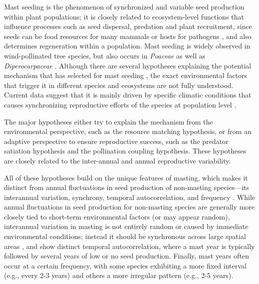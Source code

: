 \documentclass[11pt,letter]{article}
\begin{document}
Mast seeding is the phenomenon of synchronized and variable seed production within plant populations; it is closely related to ecosystem-level functions that influence processes such as seed dispersal, predation and plant recruitment, since seeds can be food resources for many mammals or hosts for pathogens  \citep{davies2024seed, janzen1971seed, kelly1994evolutionary}, and also determines regeneration within a population. Mast seeding is widely observed in wind-pollinated tree species, but also occurs in \textit{Poaceae} as well as \textit{Diperocarpaceae} \citep{kelly2002mast}. Although there are several hypotheses explaining the potential mechanism that has selected for mast seeding  \citep[e.g., predator satiation, resource matching, \textit{etc.}, discussed more in Chapter 2,][]{koenig2021brief}, the exact environmental factors that trigger it in different species and ecosystems are not fully understood. Current data suggest that it is mainly driven by specific climatic conditions that causes synchronizing reproductive efforts of the species at population level  \citep{pearse2016mechanisms}. \par
The major hypotheses either try to explain the mechanism from the environmental perspective, such as the resource matching hypothesis, or from an adaptive perspective to ensure reproductive success, such as the predator satiation hypothesis and the pollination coupling hypothesis. These hypotheses are closely related to the inter-annual and annual reproductive variability.\par

All of these hypotheses build on the unique features of masting, which makes it distinct from annual fluctuations in seed production of non-masting species---its interannual variation, synchrony, temporal autocorrelation, and frequency \citep{hacket2021climate}. While annual fluctuations in seed production for non-masting species are generally more closely tied to short-term environmental factors (or may appear random), interannual variation in masting is not entirely random or caused by immediate environmental conditions; instead it should be synchronous across large spatial areas \citep[e.g., hundreds of kilometers,][]{kelly1994evolutionary}, and show distinct temporal autocorrelation, where a mast year is typically followed by several years of low or no seed production. Finally, mast years often occur at a certain frequency, with some species exhibiting a more fixed interval (e.g., every 2-3 years) and others a more irregular pattern (e.g., 2-5 years). \par
\end{document}
